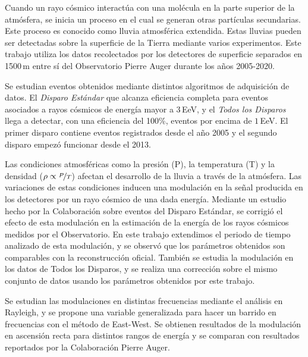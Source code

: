 \begin{resumen}%
Cuando un rayo cósmico interactúa con una molécula en la parte superior de la atmósfera, se inicia un proceso en el cual se generan otras partículas secundarias. Este proceso es conocido como lluvia atmosférica extendida. Estas lluvias pueden ser detectadas sobre la superficie de la Tierra mediante varios experimentos. Este trabajo utiliza los datos recolectados por los detectores de superficie separados en 1500\,m entre sí del Observatorio Pierre Auger durante los años 2005-2020. 

Se estudian eventos obtenidos mediante distintos algoritmos de adquisición de datos. El \emph{Disparo Estándar} que alcanza eficiencia completa para eventos asociados a rayos cósmicos de energía mayor a $3\,$EeV, y el \emph{Todos los Disparos} llega a detectar, con una eficiencia del 100\%, eventos por encima de $1\,$EeV. El primer disparo contiene eventos registrados desde el año 2005 y el segundo disparo empezó funcionar desde el 2013. 

Las condiciones atmosféricas como la presión (P), la temperatura (T) y la densidad ($\rho \propto \nicefrac{P}{T}$) afectan el desarrollo de la lluvia a través de la atmósfera. Las variaciones de estas condiciones inducen una modulación en la señal producida en los detectores por un rayo cósmico de una dada energía. Mediante un estudio hecho por la Colaboración sobre eventos del Disparo Estándar, se corrigió el efecto de esta modulación en la estimación de la energía de los rayos cósmicos medidos por el Observatorio. En este trabajo extendimos el periodo de tiempo analizado de esta modulación, y se observó que los parámetros obtenidos son comparables con la reconstrucción oficial. También se estudia la modulación en los datos de Todos los Disparos, y se realiza una corrección sobre el mismo conjunto de datos usando los parámetros obtenidos por este trabajo.

Se  estudian las modulaciones en distintas frecuencias mediante el análisis en Rayleigh, y se propone una variable generalizada para hacer un barrido en frecuencias con el método de East-West. Se obtienen resultados de la modulación en ascensión recta para distintos rangos de energía y se comparan con resultados reportados por la Colaboración Pierre Auger.

\end{resumen}


